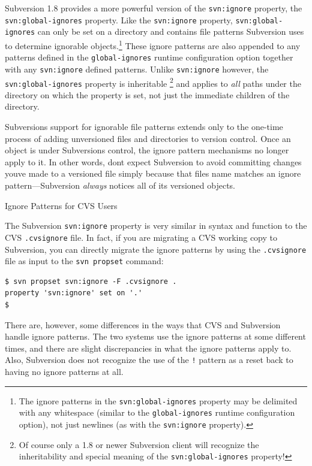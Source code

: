 Subversion 1.8 provides a more powerful version of the
\texttt{svn:ignore} property, the \texttt{svn:global-ignores} property.
Like the \texttt{svn:ignore} property, \texttt{svn:global-ignores} can
only be set on a directory and contains file patterns Subversion uses to
determine ignorable objects.\footnote{The ignore patterns in the
  \texttt{svn:global-ignores} property may be delimited with any
  whitespace (similar to the \texttt{global-ignores} runtime
  configuration option), not just newlines (as with the
  \texttt{svn:ignore} property).} These ignore patterns are also
appended to any patterns defined in the \texttt{global-ignores} runtime
configuration option together with any \texttt{svn:ignore} defined
patterns. Unlike \texttt{svn:ignore} however, the
\texttt{svn:global-ignores} property is inheritable \footnote{Of course
  only a 1.8 or newer Subversion client will recognize the
  inheritability and special meaning of the \texttt{svn:global-ignores}
  property!} and applies to \emph{all} paths under the directory on
which the property is set, not just the immediate children of the
directory.

Subversion\textquotesingle s support for ignorable file patterns extends
only to the one-time process of adding unversioned files and directories
to version control. Once an object is under Subversion\textquotesingle s
control, the ignore pattern mechanisms no longer apply to it. In other
words, don\textquotesingle t expect Subversion to avoid committing
changes you\textquotesingle ve made to a versioned file simply because
that file\textquotesingle s name matches an ignore pattern---Subversion
\emph{always} notices all of its versioned objects.

Ignore Patterns for CVS Users

The Subversion \texttt{svn:ignore} property is very similar in syntax
and function to the CVS \texttt{.cvsignore} file. In fact, if you are
migrating a CVS working copy to Subversion, you can directly migrate the
ignore patterns by using the \texttt{.cvsignore} file as input to the
\texttt{svn\ propset} command:

\begin{verbatim}
$ svn propset svn:ignore -F .cvsignore .
property 'svn:ignore' set on '.'
$
\end{verbatim}

There are, however, some differences in the ways that CVS and Subversion
handle ignore patterns. The two systems use the ignore patterns at some
different times, and there are slight discrepancies in what the ignore
patterns apply to. Also, Subversion does not recognize the use of the
\texttt{!} pattern as a reset back to having no ignore patterns at all.


